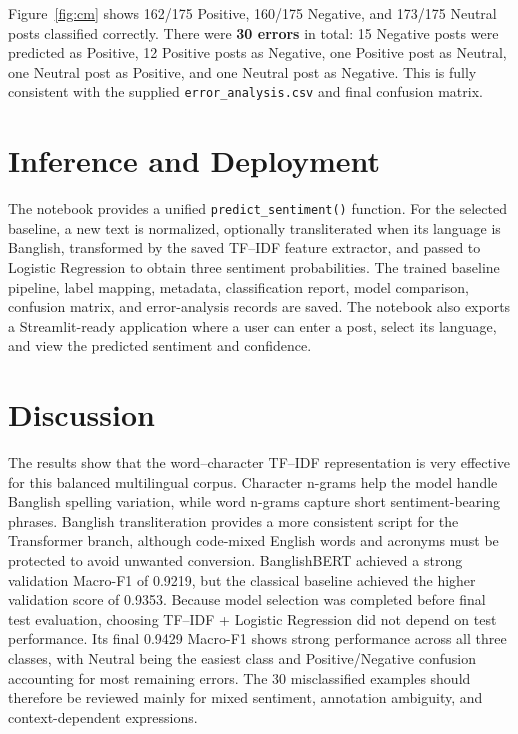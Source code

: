 \documentclass[12pt,a4paper]{report}
\begin{document}
Figure~\ref{fig:cm} shows 162/175 Positive, 160/175 Negative, and 173/175
Neutral posts classified correctly. There were \textbf{30 errors} in total:
15 Negative posts were predicted as Positive, 12 Positive posts as Negative,
one Positive post as Neutral, one Neutral post as Positive, and one Neutral
post as Negative. This is fully consistent with the supplied
\texttt{error\_analysis.csv} and final confusion matrix.

\section{Inference and Deployment}
The notebook provides a unified \texttt{predict\_sentiment()} function. For
the selected baseline, a new text is normalized, optionally transliterated
when its language is Banglish, transformed by the saved TF--IDF feature
extractor, and passed to Logistic Regression to obtain three sentiment
probabilities. The trained baseline pipeline, label mapping, metadata,
classification report, model comparison, confusion matrix, and error-analysis
records are saved. The notebook also exports a Streamlit-ready application
where a user can enter a post, select its language, and view the predicted
sentiment and confidence.

\section{Discussion}
The results show that the word--character TF--IDF representation is very
effective for this balanced multilingual corpus. Character n-grams help the
model handle Banglish spelling variation, while word n-grams capture short
sentiment-bearing phrases. Banglish transliteration provides a more
consistent script for the Transformer branch, although code-mixed English
words and acronyms must be protected to avoid unwanted conversion.
BanglishBERT achieved a strong validation Macro-F1 of 0.9219, but the
classical baseline achieved the higher validation score of 0.9353.
Because model selection was completed before final test evaluation, choosing
TF--IDF + Logistic Regression did not depend on test performance. Its final
0.9429 Macro-F1 shows strong performance across all three classes, with
Neutral being the easiest class and Positive/Negative confusion accounting
for most remaining errors. The 30 misclassified examples should therefore be
reviewed mainly for mixed sentiment, annotation ambiguity, and
context-dependent expressions.
\end{document}
